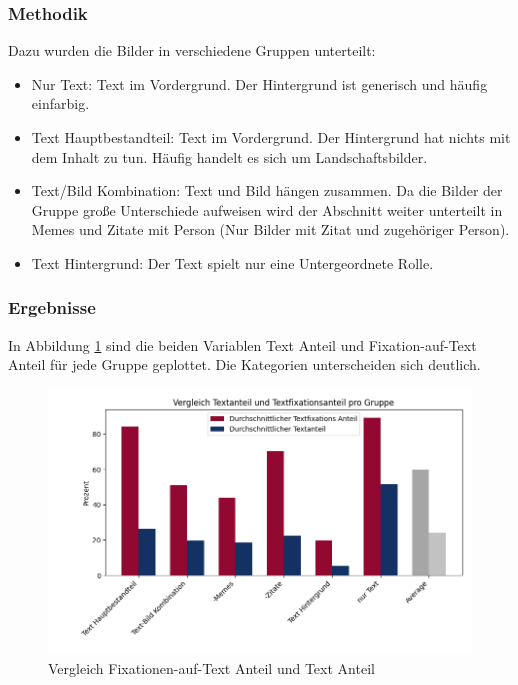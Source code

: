 \documentclass[
    language=german, %
    thesis=seminar, %
    supervisor=postdoc, %
    multiauthor=true, %
    ]{settings/csssa-thesis}
\begin{document}
\subsubsection{Methodik}
Dazu wurden die Bilder in verschiedene Gruppen unterteilt:
\begin{itemize}
    \item Nur Text: Text im Vordergrund. Der Hintergrund ist generisch und häufig einfarbig. 
    \item Text Hauptbestandteil: Text im Vordergrund. Der Hintergrund hat nichts mit dem Inhalt zu tun. Häufig handelt es sich um Landschaftsbilder. 
    \item Text/Bild Kombination: Text und Bild hängen zusammen. Da die Bilder der Gruppe große Unterschiede aufweisen wird der Abschnitt weiter unterteilt in Memes und Zitate mit Person (Nur Bilder mit Zitat und zugehöriger Person).
    \item Text Hintergrund: Der Text spielt nur eine Untergeordnete Rolle. 
\end{itemize}

\subsubsection{Ergebnisse}
In Abbildung \ref{fig:bild24} sind die beiden Variablen Text Anteil und Fixation-auf-Text Anteil für jede Gruppe geplottet. 
Die Kategorien unterscheiden sich deutlich.

\begin{figure}[h]
    \centering
    \includegraphics[width=\linewidth,height=0.8\textheight,keepaspectratio]{figures/Bild29.png}
    \caption{Vergleich Fixationen-auf-Text Anteil und Text Anteil}\label{fig:bild24}
\end{figure}
\end{document}
